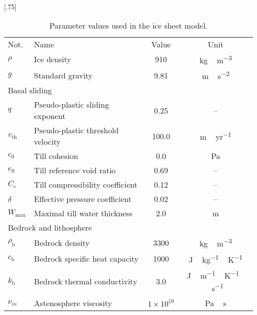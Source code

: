 \documentclass[tc, manuscript]{copernicus}
\begin{document}
\begin{table}[t]
\caption{%
      Parameter values used in the ice sheet model.}
\scalebox{.75}[.75]
{\begin{tabular}{llcc}
    \tophline
    Not.    & Name & Value & Unit \\
    \middlehline
    $\rho$  & Ice density
            & 910
            & \unit{kg\,m^{-3}} \\

    $g$     & Standard gravity
            & 9.81
            & \unit{m\,s^{-2}} \\
    \cline{1-4}
    \multicolumn{2}{l}{{Basal sliding}} \\
    \cline{1-4}
    $q$     & Pseudo-plastic sliding exponent
            & 0.25
            & -- \\

    $v_{\text{th}}$& Pseudo-plastic threshold velocity
            & 100.0
            & \unit{m\,yr^{-1}} \\

    $c_0$   & Till cohesion
            & 0.0
            & Pa \\

    $e_0$   & Till reference void ratio
            & 0.69
            & -- \\

    $C_{\mathrm{c}}$   & Till compressibility coefficient
            & 0.12
            & -- \\

    $\delta$& Effective pressure coefficient
            & 0.02
            & -- \\

    $W_{\text{max}}$ & Maximal till water thickness
            & 2.0
            & m \\
    \cline{1-4}
    \multicolumn{2}{l}{{Bedrock and lithosphere}} \\
    \cline{1-4}
    $\rho_{\mathrm{b}}$& Bedrock density
            & 3300
            & \unit{kg\,m^{-3}} \\

    $c_{\mathrm{b}}$   & Bedrock specific heat capacity
            & 1000
            & \unit{J\,kg^{-1}\,K^{-1}} \\

    $k_{\mathrm{b}}$   & Bedrock thermal conductivity
            & 3.0
            & \unit{J\,m^{-1}\,K^{-1}\,s^{-1}} \\

    $\nu_m$ & Astenosphere viscosity
            & $1\times10^{19}$
            & \unit{Pa\,s} \\


\end{tabular}}
\end{table}
\end{document}
